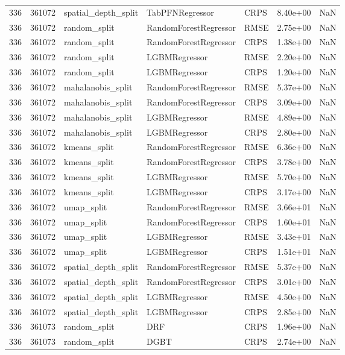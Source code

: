 \begin{tabular}{rrlllrr}
336 & 361072 & spatial\_depth\_split & TabPFNRegressor & CRPS & 8.40e+00 & NaN \\
336 & 361072 & random\_split & RandomForestRegressor & RMSE & 2.75e+00 & NaN \\
336 & 361072 & random\_split & RandomForestRegressor & CRPS & 1.38e+00 & NaN \\
336 & 361072 & random\_split & LGBMRegressor & RMSE & 2.20e+00 & NaN \\
336 & 361072 & random\_split & LGBMRegressor & CRPS & 1.20e+00 & NaN \\
336 & 361072 & mahalanobis\_split & RandomForestRegressor & RMSE & 5.37e+00 & NaN \\
336 & 361072 & mahalanobis\_split & RandomForestRegressor & CRPS & 3.09e+00 & NaN \\
336 & 361072 & mahalanobis\_split & LGBMRegressor & RMSE & 4.89e+00 & NaN \\
336 & 361072 & mahalanobis\_split & LGBMRegressor & CRPS & 2.80e+00 & NaN \\
336 & 361072 & kmeans\_split & RandomForestRegressor & RMSE & 6.36e+00 & NaN \\
336 & 361072 & kmeans\_split & RandomForestRegressor & CRPS & 3.78e+00 & NaN \\
336 & 361072 & kmeans\_split & LGBMRegressor & RMSE & 5.70e+00 & NaN \\
336 & 361072 & kmeans\_split & LGBMRegressor & CRPS & 3.17e+00 & NaN \\
336 & 361072 & umap\_split & RandomForestRegressor & RMSE & 3.66e+01 & NaN \\
336 & 361072 & umap\_split & RandomForestRegressor & CRPS & 1.60e+01 & NaN \\
336 & 361072 & umap\_split & LGBMRegressor & RMSE & 3.43e+01 & NaN \\
336 & 361072 & umap\_split & LGBMRegressor & CRPS & 1.51e+01 & NaN \\
336 & 361072 & spatial\_depth\_split & RandomForestRegressor & RMSE & 5.37e+00 & NaN \\
336 & 361072 & spatial\_depth\_split & RandomForestRegressor & CRPS & 3.01e+00 & NaN \\
336 & 361072 & spatial\_depth\_split & LGBMRegressor & RMSE & 4.50e+00 & NaN \\
336 & 361072 & spatial\_depth\_split & LGBMRegressor & CRPS & 2.85e+00 & NaN \\
336 & 361073 & random\_split & DRF & CRPS & 1.96e+00 & NaN \\
336 & 361073 & random\_split & DGBT & CRPS & 2.74e+00 & NaN \\

\end{tabular}

